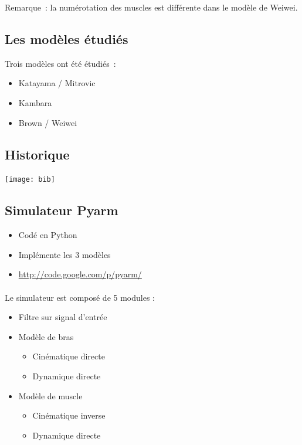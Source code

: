 \documentclass[pdftex,a4paper,11pt]{article}
\numberwithin{equation}{subsection}
\begin{document}
Remarque~: la numérotation des muscles est différente dans le modèle de Weiwei.

\subsection{Les modèles étudiés}
Trois modèles ont été étudiés~:
\begin{itemize}
    \item Katayama / Mitrovic \cite{katayama1993, ozkaya1999, mitrovic10, mitrovic2008, mitrovic2009}
    \item Kambara \cite{kambara2009, ozkaya1999}
    \item Brown / Weiwei \cite{brown1999, li2006, li2004, todorov2005}
\end{itemize}

\subsection{Historique}

\begin{center}
        \texttt{[image: bib]}
\end{center}

\subsection{Simulateur Pyarm}

\begin{itemize}
    \item Codé en Python
    \item Implémente les 3 modèles
    \item \url{http://code.google.com/p/pyarm/}
\end{itemize}


\paragraph{}
Le simulateur est composé de 5 modules :
\begin{itemize}
    \item Filtre sur signal d'entrée
    \item Modèle de bras
    \begin{itemize}
        \item Cinématique directe
        \item Dynamique directe
    \end{itemize}
    \item Modèle de muscle
    \begin{itemize}
        \item Cinématique inverse
        \item Dynamique directe
    \end{itemize}
\end{itemize}
\end{document}

